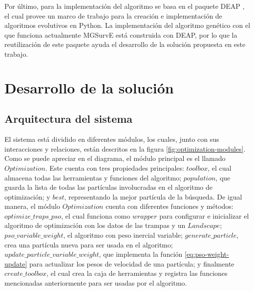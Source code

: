 \documentclass[letterpaper]{report}
\begin{document}
    Por último, para la implementación del algoritmo se basa en el paquete DEAP
    \cite{DEAPDocs}, el cual provee un marco de trabajo para la creación e
    implementación de algoritmos evolutivos en Python. La implementación del
    algoritmo genético con el que funciona actualmente MGSurvE está construida
    con DEAP, por lo que la reutilización de este paquete ayuda el desarrollo de
    la solución propuesta en este trabajo.

  \section{Desarrollo de la solución}
    \subsection{Arquitectura del sistema}

    El sistema está dividido en diferentes módulos, los cuales, junto con sus
    interacciones y relaciones, están descritos en la figura
    \ref{fig:optimization-modules}. Como se puede apreciar en el diagrama, el
    módulo principal es el llamado $Optimization$. Este cuenta con tres
    propiedades principales: $toolbox$, el cual almacena todas las herramientas
    y funciones del algoritmo; $population$, que guarda la lista de todas las
    partículas involucradas en el algoritmo de optimización; y $best$,
    representando la mejor partícula de la búsqueda. De igual manera, el módulo
    $Optimization$ cuenta con diferentes funciones y métodos:
    $optimize\_traps\_pso$, el cual funciona como $wrapper$ para configurar e
    inicializar el algoritmo de optimización con los datos de las trampas y un
    $Landscape$; $pso\_variable\_weight$, el algoritmo con peso inercial
    variable; $generate\_particle$, crea una partícula nueva para ser usada en
    el algoritmo; $update\_particle\_variable\_weight$, que implementa la
    función \ref{eq:pso-weight-update} para actualizar los pesos de velocidad de
    una partícula; y finalmente $create\_toolbox$, el cual crea la caja de
    herramientas y registra las funciones mencionadas anteriormente para ser
    usadas por el algoritmo.
\end{document}
